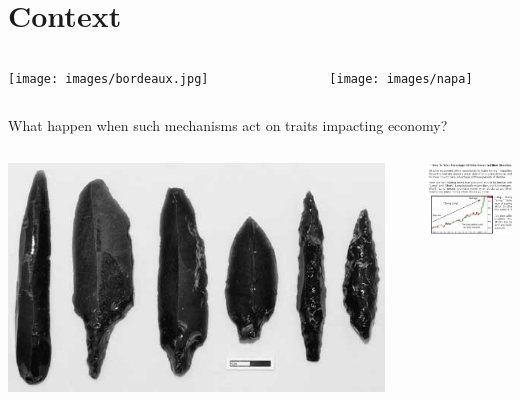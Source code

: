 \documentclass[12pt, handout=show,notes=show]{beamer}
\begin{document}
\section{Context}


\begin{frame}
	\begin{columns}
		\begin{column}{.3\textwidth}
			\texttt{[image: images/bordeaux.jpg]}	
		\end{column}

		\begin{column}{.2\textwidth}
		\end{column}
		\begin{column}{.3\textwidth}
			\texttt{[image: images/napa]}	
		\end{column}
	\end{columns}
	\begin{center}
		What happen when such mechanisms act on traits impacting economy?
	\end{center}
	\begin{columns}
		\begin{column}{.3\textwidth}
			\includegraphics[width=\textwidth]{images/tools}	
		\end{column}
		\begin{column}{.2\textwidth}
		\end{column}
		\begin{column}{.3\textwidth}
			\includegraphics[width=3cm]{images/stockoption}	
		\end{column}
	\end{columns}
\end{frame}
\end{document}
